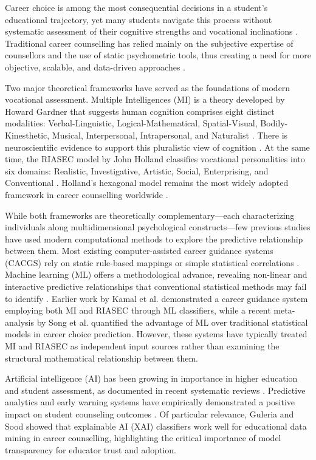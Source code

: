 \documentclass[12pt, a4paper]{article}
\begin{document}
\bigskip

Career choice is among the most consequential decisions in a student's educational trajectory, yet many students navigate this process without systematic assessment of their cognitive strengths and vocational inclinations \cite{leung2022new}. Traditional career counselling has relied mainly on the subjective expertise of counsellors and the use of static psychometric tools, thus creating a need for more objective, scalable, and data-driven approaches \cite{elhaji2020proposal}.

Two major theoretical frameworks have served as the foundations of modern vocational assessment. Multiple Intelligences (MI) is a theory developed by Howard Gardner that suggests human cognition comprises eight distinct modalities: Verbal-Linguistic, Logical-Mathematical, Spatial-Visual, Bodily-Kinesthetic, Musical, Interpersonal, Intrapersonal, and Naturalist \cite{gardner2011frames}. There is neuroscientific evidence to support this pluralistic view of cognition \cite{shearer2018multiple}. At the same time, the RIASEC model by John Holland classifies vocational personalities into six domains: Realistic, Investigative, Artistic, Social, Enterprising, and Conventional \cite{holland1997making}. Holland's hexagonal model remains the most widely adopted framework in career counselling worldwide \cite{nauta2010holland}.

While both frameworks are theoretically complementary---each characterizing individuals along multidimensional psychological constructs---few previous studies have used modern computational methods to explore the predictive relationship between them. Most existing computer-assisted career guidance systems (CACGS) rely on static rule-based mappings or simple statistical correlations \cite{leung2022new}. Machine learning (ML) offers a methodological advance, revealing non-linear and interactive predictive relationships that conventional statistical methods may fail to identify \cite{romero2020educational}. Earlier work by Kamal et al. \citeyear{kamal2021smart} demonstrated a career guidance system employing both MI and RIASEC through ML classifiers, while a recent meta-analysis by Song et al. \citeyear{song2024investigating} quantified the advantage of ML over traditional statistical models in career choice prediction. However, these systems have typically treated MI and RIASEC as independent input sources rather than examining the structural mathematical relationship between them.

Artificial intelligence (AI) has been growing in importance in higher education and student assessment, as documented in recent systematic reviews \cite{crompton2023artificial, zawacki2019systematic, chen2020artificial}. Predictive analytics and early warning systems have empirically demonstrated a positive impact on student counseling outcomes \cite{plak2021early}. Of particular relevance, Guleria and Sood \citeyear{guleria2022explainable} showed that explainable AI (XAI) classifiers work well for educational data mining in career counselling, highlighting the critical importance of model transparency for educator trust and adoption.
\end{document}
